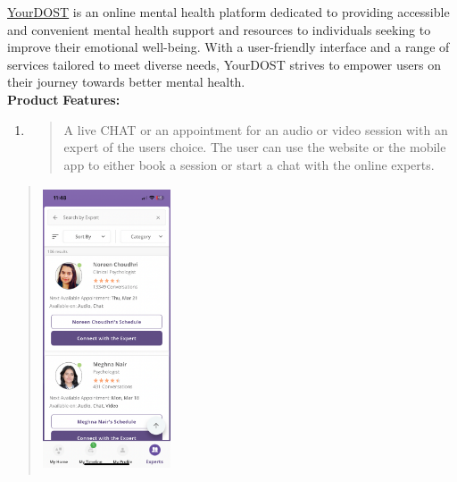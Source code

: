 \documentclass[manuscript,screen,review]{acmart}
\begin{document}
\href{https://yourdost.com/userDashboard\#/home}{\uline{YourDOST}} is an
online mental health platform dedicated to providing accessible and
convenient mental health support and resources to individuals seeking to
improve their emotional well-being. With a user-friendly interface and a
range of services tailored to meet diverse needs, YourDOST strives to
empower users on their journey towards better mental health.\\
\textbf{Product} \textbf{Features:}
\begin{enumerate}
\def\labelenumi{\arabic{enumi}.}
\item
  \begin{quote}
  A live CHAT or an appointment for an audio or video session with an
  expert of the user\textquotesingle s choice. The user can use the website or the mobile app to either book a session
or start a chat with the online experts.
  \end{quote}
\end{enumerate}
\begin{quote}
\includegraphics[width=1.49474in,height=3.31321in]{vertopal.com_Untitleddocument/vertopal_25c0ff455f73469eb1b6e3e4452807f6/media/image9.png}
\end{quote}
\end{document}

